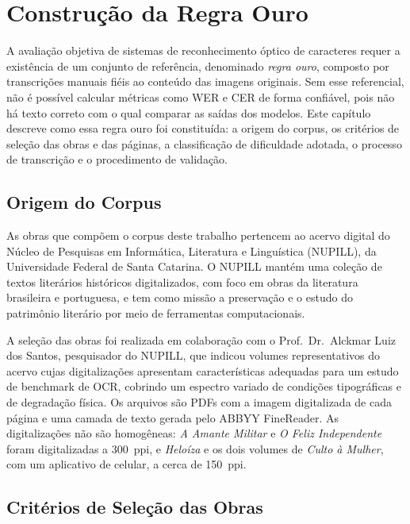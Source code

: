\documentclass[noabntexcite,oneside]{ufsc-thesis-rn46-2019}
\begin{document}
\chapter{Construção da Regra Ouro}
\label{cap:regra_ouro}

A avaliação objetiva de sistemas de reconhecimento óptico de caracteres requer a
existência de um conjunto de referência, denominado \textit{regra ouro}, composto por
transcrições manuais fiéis ao conteúdo das imagens originais. Sem esse referencial, não
é possível calcular métricas como WER e CER de forma confiável, pois não há texto correto
com o qual comparar as saídas dos modelos. Este capítulo descreve como essa regra ouro
foi constituída: a origem do corpus, os critérios de seleção das obras e das páginas, a
classificação de dificuldade adotada, o processo de transcrição e o procedimento
de validação.

\section{Origem do Corpus}

As obras que compõem o corpus deste trabalho pertencem ao acervo digital do Núcleo de
Pesquisas em Informática, Literatura e Linguística (NUPILL), da Universidade Federal de
Santa Catarina. O NUPILL mantém uma coleção de textos literários históricos digitalizados,
com foco em obras da literatura brasileira e portuguesa, e tem como missão a preservação
e o estudo do patrimônio literário por meio de ferramentas computacionais.

A seleção das obras foi realizada em colaboração com o Prof.\ Dr.\ Alckmar Luiz dos
Santos, pesquisador do NUPILL, que indicou volumes representativos do acervo cujas
digitalizações apresentam características adequadas para um estudo de benchmark de OCR,
cobrindo um espectro variado de condições tipográficas e de degradação física. Os
arquivos são PDFs com a imagem digitalizada de cada página e uma camada de texto gerada
pelo ABBYY FineReader. As digitalizações não são homogêneas: \textit{A Amante Militar} e
\textit{O Feliz Independente} foram digitalizadas a 300~ppi, e \textit{Heloíza} e os
dois volumes de \textit{Culto à Mulher}, com um aplicativo de celular, a cerca de
150~ppi.

\section{Critérios de Seleção das Obras}
\end{document}
